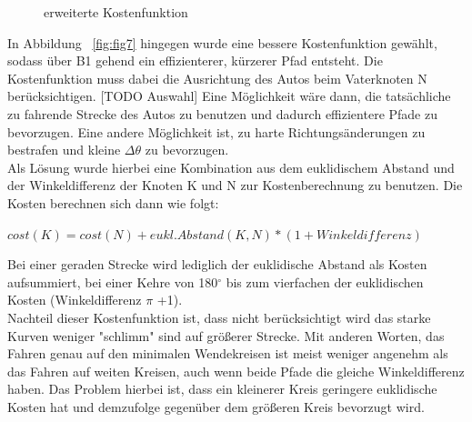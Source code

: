 \begin{figure}[htb]
\begin{minipage}[t]{0.45\linewidth}
        \caption{erweiterte Kostenfunktion}
    \end{minipage}
\end{figure}


In Abbildung ~\ref{fig:fig7} hingegen wurde eine bessere Kostenfunktion gewählt, sodass über B1 gehend ein effizienterer, kürzerer Pfad entsteht. Die Kostenfunktion muss dabei die Ausrichtung des Autos beim Vaterknoten N berücksichtigen. [TODO Auswahl] Eine Möglichkeit wäre dann, die tatsächliche zu fahrende Strecke des Autos zu benutzen und dadurch effizientere Pfade zu bevorzugen. Eine andere Möglichkeit ist, zu harte Richtungsänderungen zu bestrafen und kleine $ \Delta \theta$ zu bevorzugen. \\
Als Lösung wurde hierbei eine Kombination aus dem euklidischem Abstand und der Winkeldifferenz der Knoten K und N zur Kostenberechnung zu benutzen. Die Kosten berechnen sich dann wie folgt: 
\begin{center}
$cost(K) = cost(N) +eukl. Abstand(K,N) * (1+Winkeldifferenz)$
\end{center} 
Bei einer geraden Strecke wird lediglich der euklidische Abstand als Kosten aufsummiert, bei einer Kehre von 180$^{\circ}$ bis zum vierfachen der euklidischen Kosten (Winkeldifferenz $\pi$ +1).\\
Nachteil dieser Kostenfunktion ist, dass nicht berücksichtigt wird das starke Kurven weniger "schlimm" sind auf größerer Strecke. Mit anderen Worten, das Fahren genau auf den minimalen Wendekreisen ist meist weniger angenehm als das Fahren auf weiten Kreisen, auch wenn beide Pfade die gleiche Winkeldifferenz haben. Das Problem hierbei ist, dass ein kleinerer Kreis geringere euklidische Kosten hat und demzufolge gegenüber dem größeren Kreis bevorzugt wird.
